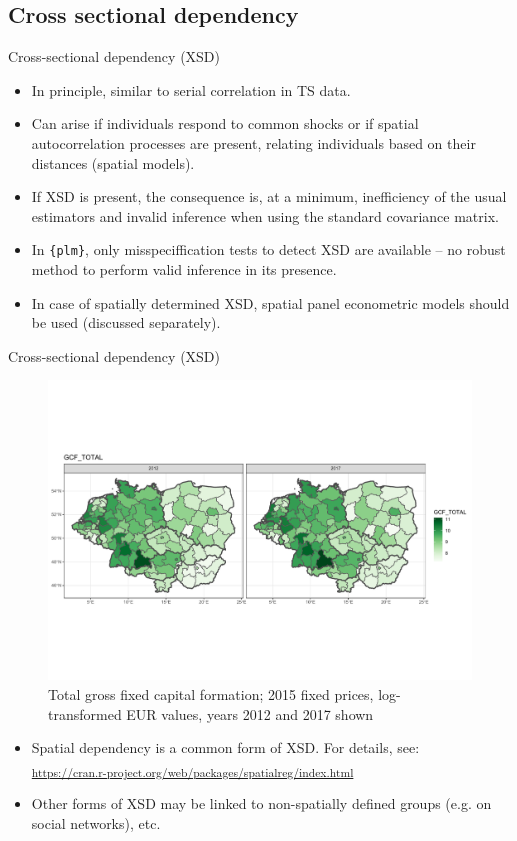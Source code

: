 \documentclass[usenames,dvipsnames]{beamer}
\begin{document}
\subsection*{Cross sectional dependency}
\begin{frame}{Cross-sectional dependency (XSD)}
\begin{itemize}
    \item In principle, similar to serial correlation in TS data.
    \medskip
    \item Can arise if individuals respond to common shocks or if spatial autocorrelation processes are present, relating individuals based on their distances (spatial models).
    \medskip
    \item If XSD is present, the consequence is, at a minimum, inefficiency of the usual estimators and invalid inference when using the standard covariance matrix.
    \medskip
    \item In \texttt{\{plm\}}, only misspeciffication tests to detect XSD are available – no robust method to perform valid inference in its presence.
    \medskip
    \item In case of spatially determined XSD, spatial panel econometric models should be used (discussed separately).
\end{itemize}
\end{frame}
\begin{frame}{Cross-sectional dependency (XSD)}
\small
\begin{figure}[htbp] 
\includegraphics[trim = 0cm 5cm 0cm 5.7cm, clip, width=1\textwidth]{img/GCF_total.pdf}
\caption{\small{Total gross fixed capital formation; 2015 fixed prices, log-transformed EUR values, years 2012 and 2017 shown}} \label{fig:choropleth2}
\end{figure}
\begin{itemize}
    \item Spatial dependency is a common form of XSD. For details, see:\\
    \textsubscript{ \textcolor{Blue}{\url{https://cran.r-project.org/web/packages/spatialreg/index.html}} }
    \medskip
    \item Other forms of XSD may be linked to non-spatially defined groups (e.g. on social networks), etc.
\end{itemize}
\end{frame}
\end{document}
